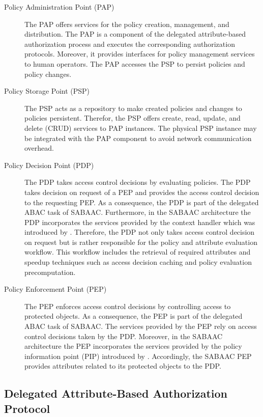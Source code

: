 \begin{description}
    \item[Policy Administration Point (PAP)] The PAP offers services for the policy creation, management, and distribution.
    The PAP is a component of the delegated attribute-based authorization process and executes the corresponding authorization protocols.
    Moreover, it provides interfaces for policy management services to human operators.
    The PAP accesses the PSP to persist policies and policy changes.
    \item[Policy Storage Point (PSP)] The PSP acts as a repository to make created policies and changes to policies persistent.
    Therefor, the PSP offers create, read, update, and delete (CRUD) services to PAP instances.
    The physical PSP instance may be integrated with the PAP component to avoid network communication overhead.
    \item[Policy Decision Point (PDP)] The PDP takes access control decisions by evaluating policies.
    The PDP takes decision on request of a PEP and provides the access control decision to the requesting PEP.
    As a consequence, the PDP is part of the delegated ABAC task of SABAAC.
    Furthermore, in the SABAAC architecture the PDP incorporates the services provided by the context handler which was introduced by \citeauthor{Hu2014} \cite{Hu2014}.
    Therefore, the PDP not only takes access control decision on request but is rather responsible for the policy and attribute evaluation workflow.
    This workflow includes the retrieval of required attributes and speedup techniques such as access decision caching and policy evaluation precomputation.
    \item[Policy Enforcement Point (PEP)] The PEP enforces access control decisions by controlling access to protected objects.
    As a consequence, the PEP is part of the delegated ABAC task of SABAAC.
    The services provided by the PEP rely on access control decisions taken by the PDP.
    Moreover, in the SABAAC architecture the PEP incorporates the services provided by the policy information point (PIP) introduced by \citeauthor{Hu2014} \cite{Hu2014}.
    Accordingly, the SABAAC PEP provides attributes related to its protected objects to the PDP.
\end{description}

\subsection{Delegated Attribute-Based Authorization Protocol}
\label{sec:approach:sabaac:authorization}

